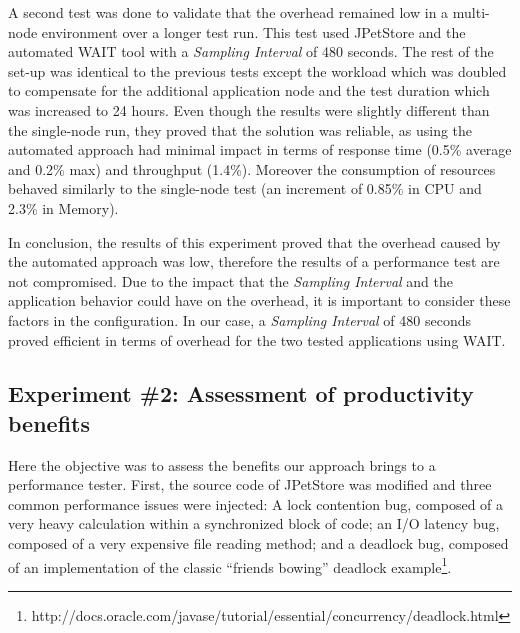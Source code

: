 \documentclass[runningheads,a4paper]{llncs}
\begin{document}
A second test was done to validate that the overhead remained low in a
multi-node environment over a longer test run. This test used JPetStore and the
automated WAIT tool with a \emph{Sampling Interval} of 480 seconds. The rest of
the set-up was identical to the previous tests except the workload which was doubled
to compensate for the additional application node and the test duration which
was increased to 24 hours. Even though the results were slightly different than the
single-node run, they proved that the solution was reliable, as using the
automated approach had minimal impact in terms of response time (0.5\% 
average and 0.2\% max) and throughput (1.4\%). Moreover the consumption
of resources behaved similarly to the single-node test (an increment of 0.85\%
in CPU and 2.3\% in Memory). 


In conclusion, the results of this experiment proved that the
overhead caused by the automated approach was low, therefore the results of a
performance test are not compromised. Due to the impact that the \emph{Sampling
Interval} and the application behavior could have on the overhead, it is important to 
consider these factors in the configuration. In our case, a \emph{Sampling
Interval} of 480 seconds proved efficient in terms of overhead for the two tested applications using WAIT.

\vspace{-7pt}
\subsection{Experiment \#2: Assessment of productivity benefits}
\label{Experiment_2_Results}
\vspace{-7pt}

Here the objective was to assess the benefits our approach brings to a
performance tester. First, the source code of JPetStore was modified and three
common performance issues were injected: A lock contention bug, composed of a
very heavy calculation within a synchronized block of code; an I/O latency bug,
composed of a very expensive file reading method; and a deadlock bug, composed
of an implementation of the classic ``friends bowing'' deadlock
example\footnote{http://docs.oracle.com/javase/tutorial/essential/concurrency/deadlock.html}.

\end{document}
